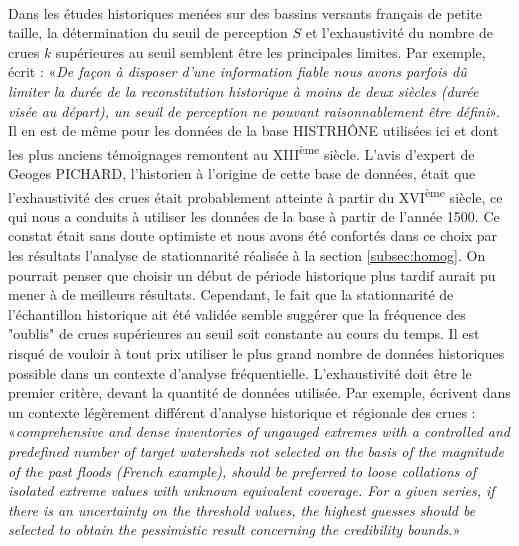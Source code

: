 	\paragraph{} Dans les études historiques menées sur des bassins versants français de petite taille, la détermination du seuil de perception $S$ et l'exhaustivité du nombre de crues $k$ supérieures au seuil semblent être les principales limites. Par exemple, \citet{payrastre_possibility_2005} écrit : «\textit{De façon à disposer d'une information fiable nous avons parfois dû limiter la durée de la reconstitution historique à moins de deux siècles (durée visée au départ), un seuil de perception ne pouvant raisonnablement être défini}». Il en est de même pour les données de la base HISTRHÔNE utilisées ici et dont les plus anciens témoignages remontent au XIII\textsuperscript{ème} siècle. L'avis d'expert de Geoges PICHARD, l'historien à l'origine de cette base de données, était que l'exhaustivité des crues était probablement atteinte à partir du XVI\textsuperscript{ème} siècle, ce qui nous a conduits à utiliser les données de la base à partir de l'année 1500. Ce constat était sans doute optimiste et nous avons été confortés dans ce choix par les résultats l'analyse de stationnarité réalisée à la section \ref{subsec:homog}. On pourrait penser que choisir un début de période historique plus tardif aurait pu mener à de meilleurs résultats. Cependant, le fait que la stationnarité de l'échantillon historique ait été validée semble suggérer que la fréquence des "oublis" de crues supérieures au seuil soit constante au cours du temps. Il est risqué de vouloir à tout prix utiliser le plus grand nombre de données historiques possible dans un contexte d'analyse fréquentielle. L'exhaustivité doit être le premier critère, devant la quantité de données utilisée. Par exemple, \citet{gaume_bayesian_2010} écrivent dans un contexte légèrement différent d'analyse historique et régionale des crues : «\textit{comprehensive and dense inventories of ungauged extremes with a controlled and predefined number of target watersheds not selected on the basis of the magnitude of the past floods (French example), should be preferred to loose collations of isolated extreme values with unknown equivalent coverage. For a given series, if there is an uncertainty on the threshold values, the highest guesses should be selected to obtain the pessimistic result concerning the credibility bounds.}»
	
